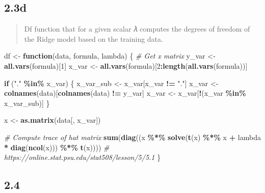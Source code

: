 \documentclass[
]{article}
\newenvironment{Shaded}{\begin{snugshade}}{\end{snugshade}}
\newcommand{\CommentTok}[1]{\textcolor[rgb]{0.56,0.35,0.01}{\textit{#1}}}
\newcommand{\ControlFlowTok}[1]{\textcolor[rgb]{0.13,0.29,0.53}{\textbf{#1}}}
\newcommand{\DecValTok}[1]{\textcolor[rgb]{0.00,0.00,0.81}{#1}}
\newcommand{\FunctionTok}[1]{\textcolor[rgb]{0.13,0.29,0.53}{\textbf{#1}}}
\newcommand{\NormalTok}[1]{#1}
\newcommand{\OtherTok}[1]{\textcolor[rgb]{0.56,0.35,0.01}{#1}}
\newcommand{\SpecialCharTok}[1]{\textcolor[rgb]{0.81,0.36,0.00}{\textbf{#1}}}
\newcommand{\StringTok}[1]{\textcolor[rgb]{0.31,0.60,0.02}{#1}}
\begin{document}
\hypertarget{d}{%
\subsection{2.3d}\label{d}}

\begin{quote}
Df function that for a given scalar 𝜆 computes the degrees of freedom of
the Ridge model based on the training data.
\end{quote}

\begin{Shaded}
\begin{Highlighting}[]
\NormalTok{df }\OtherTok{\textless{}{-}} \ControlFlowTok{function}\NormalTok{(data, formula, lambda) \{}
  \CommentTok{\# Get x matrix}
\NormalTok{  y\_var }\OtherTok{\textless{}{-}} \FunctionTok{all.vars}\NormalTok{(formula)[}\DecValTok{1}\NormalTok{]}
\NormalTok{  x\_var }\OtherTok{\textless{}{-}} \FunctionTok{all.vars}\NormalTok{(formula)[}\DecValTok{2}\SpecialCharTok{:}\FunctionTok{length}\NormalTok{(}\FunctionTok{all.vars}\NormalTok{(formula))]}
  
  \ControlFlowTok{if}\NormalTok{ (}\StringTok{"."} \SpecialCharTok{\%in\%}\NormalTok{ x\_var) \{}
\NormalTok{    x\_var\_sub }\OtherTok{\textless{}{-}}\NormalTok{ x\_var[x\_var }\SpecialCharTok{!=} \StringTok{"."}\NormalTok{]}
\NormalTok{    x\_var }\OtherTok{\textless{}{-}} \FunctionTok{colnames}\NormalTok{(data)[}\FunctionTok{colnames}\NormalTok{(data) }\SpecialCharTok{!=}\NormalTok{ y\_var]}
\NormalTok{    x\_var }\OtherTok{\textless{}{-}}\NormalTok{ x\_var[}\SpecialCharTok{!}\NormalTok{(x\_var }\SpecialCharTok{\%in\%}\NormalTok{ x\_var\_sub)]}
\NormalTok{  \}}
  
\NormalTok{  x }\OtherTok{\textless{}{-}} \FunctionTok{as.matrix}\NormalTok{(data[, x\_var])}
  
  \CommentTok{\# Compute trace of hat matrix}
  \FunctionTok{sum}\NormalTok{(}\FunctionTok{diag}\NormalTok{((x }\SpecialCharTok{\%*\%} \FunctionTok{solve}\NormalTok{(}\FunctionTok{t}\NormalTok{(x) }\SpecialCharTok{\%*\%}\NormalTok{ x }\SpecialCharTok{+}\NormalTok{ lambda }\SpecialCharTok{*} \FunctionTok{diag}\NormalTok{(}\FunctionTok{ncol}\NormalTok{(x))) }\SpecialCharTok{\%*\%} \FunctionTok{t}\NormalTok{(x)))) }\CommentTok{\# https://online.stat.psu.edu/stat508/lesson/5/5.1}
\NormalTok{\}}
\end{Highlighting}
\end{Shaded}

\hypertarget{section-7}{%
\subsection{2.4}\label{section-7}}
\end{document}
